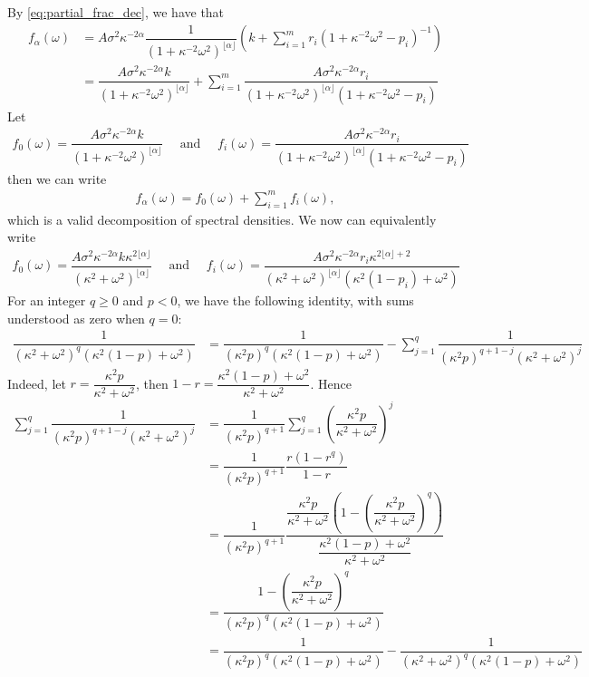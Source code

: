 \documentclass[11pt,a4paper]{article}
\theoremstyle{plain}
\theoremstyle{definition}
\begin{document}
By \eqref{eq:partial_frac_dec}, we have that 
\begin{align}
    f_\alpha(\omega)& = A\sigma^2\kappa^{-2\alpha}\dfrac{1}{(1+\kappa^{-2}\omega^2)^{\lfloor\alpha\rfloor} }\left(k + \sum_{i=1}^mr_i(1+\kappa^{-2}\omega^2-p_i)^{-1}\right)\\
    & = \dfrac{A\sigma^2\kappa^{-2\alpha}k}{(1+\kappa^{-2}\omega^2)^{\lfloor\alpha\rfloor}}+ \sum_{i=1}^m\dfrac{A\sigma^2\kappa^{-2\alpha}r_i}{(1+\kappa^{-2}\omega^2)^{\lfloor\alpha\rfloor}(1+\kappa^{-2}\omega^2-p_i)}
\end{align}
Let 
\begin{align}
    f_0(\omega) = \dfrac{A\sigma^2\kappa^{-2\alpha}k}{(1+\kappa^{-2}\omega^2)^{\lfloor\alpha\rfloor}}\quad\text{ and }\quad f_i(\omega) = \dfrac{A\sigma^2\kappa^{-2\alpha}r_i}{(1+\kappa^{-2}\omega^2)^{\lfloor\alpha\rfloor}(1+\kappa^{-2}\omega^2-p_i)}
\end{align}
then we can write
\begin{align}
    f_\alpha(\omega) = f_0(\omega) + \sum_{i=1}^mf_i(\omega),
\end{align}
which is a valid decomposition of spectral densities.
We now can equivalently write 
\begin{align}
    f_0(\omega) = \dfrac{A\sigma^2\kappa^{-2\alpha}k\kappa^{2\lfloor\alpha\rfloor}}{(\kappa^2+\omega^2)^{\lfloor\alpha\rfloor}}\quad \text{ and }\quad f_i(\omega) = \dfrac{A\sigma^2\kappa^{-2\alpha}r_i\kappa^{2\lfloor\alpha\rfloor+2}}{(\kappa^{2}+\omega^2)^{\lfloor\alpha\rfloor}(\kappa^{2}(1-p_i)+\omega^2)}
\end{align}
For an integer $q\geq0$ and $p<0$, we have the following identity,
with sums understood as zero when $q=0$:
\begin{align}
    \dfrac{1}{(\kappa^{2}+\omega^2)^{q}(\kappa^{2}(1-p)+\omega^2)}& = \dfrac{1}{(\kappa^{2}p)^{q}(\kappa^{2}(1-p)+\omega^2)} - \sum_{j=1}^q  \dfrac{1}{(\kappa^{2}p)^{q+1-j}(\kappa^{2}+\omega^2)^j}
\end{align}
Indeed, let $r = \dfrac{\kappa^2p}{\kappa^{2}+\omega^2}$, then $1-r = \dfrac{\kappa^2(1-p)+\omega^2}{\kappa^2+\omega^2}$. Hence
\begin{align*}
    \sum_{j=1}^q  \dfrac{1}{(\kappa^{2}p)^{q+1-j}(\kappa^{2}+\omega^2)^j} & = \dfrac{1}{(\kappa^{2}p)^{q+1}} \sum_{j=1}^q  \left(\dfrac{\kappa^2p}{\kappa^{2}+\omega^2}\right)^j\\
    & = \dfrac{1}{(\kappa^{2}p)^{q+1}} \dfrac{r(1-r^q)}{1-r}\\
    & = \dfrac{1}{(\kappa^{2}p)^{q+1}} \dfrac{\dfrac{\kappa^2p}{\kappa^{2}+\omega^2}\left(1-\left(\dfrac{\kappa^2p}{\kappa^{2}+\omega^2}\right)^q\right)}{\dfrac{\kappa^2(1-p)+\omega^2}{\kappa^2+\omega^2}}\\
    & = \dfrac{1-\left(\dfrac{\kappa^2p}{\kappa^{2}+\omega^2}\right)^q}{(\kappa^{2}p)^{q}(\kappa^2(1-p)+\omega^2)}\\
    & = \dfrac{1}{(\kappa^{2}p)^{q}(\kappa^2(1-p)+\omega^2)} - \dfrac{1}{(\kappa^2+\omega^2)^q(\kappa^2(1-p)+\omega^2)}
\end{align*}
\end{document}
